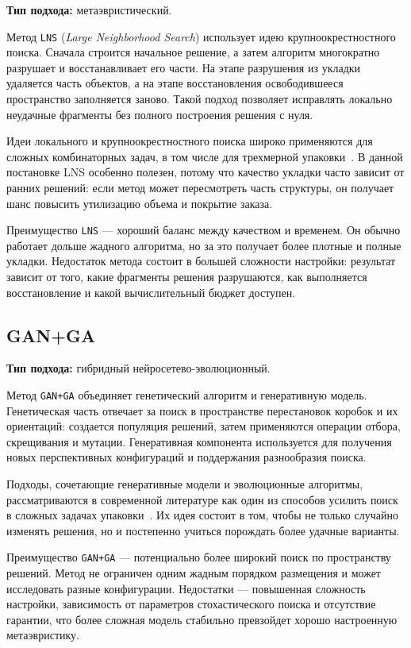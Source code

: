 \documentclass[14pt,a4paper]{extarticle}
\begin{document}
\textbf{Тип подхода:} метаэвристический.

Метод \texttt{LNS} (\textit{Large Neighborhood Search}) использует идею крупноокрестностного поиска. Сначала строится начальное решение, а затем алгоритм многократно разрушает и восстанавливает его части. На этапе разрушения из укладки удаляется часть объектов, а на этапе восстановления освободившееся пространство заполняется заново. Такой подход позволяет исправлять локально неудачные фрагменты без полного построения решения с нуля.

Идеи локального и крупноокрестностного поиска широко применяются для сложных комбинаторных задач, в том числе для трехмерной упаковки~\cite{faroe2003,martello2000}. В данной постановке LNS особенно полезен, потому что качество укладки часто зависит от ранних решений: если метод может пересмотреть часть структуры, он получает шанс повысить утилизацию объема и покрытие заказа.

Преимущество \texttt{LNS} --- хороший баланс между качеством и временем. Он обычно работает дольше жадного алгоритма, но за это получает более плотные и полные укладки. Недостаток метода состоит в большей сложности настройки: результат зависит от того, какие фрагменты решения разрушаются, как выполняется восстановление и какой вычислительный бюджет доступен.

\subsection{GAN+GA}

\textbf{Тип подхода:} гибридный нейросетево-эволюционный.

Метод \texttt{GAN+GA} объединяет генетический алгоритм и генеративную модель. Генетическая часть отвечает за поиск в пространстве перестановок коробок и их ориентаций: создается популяция решений, затем применяются операции отбора, скрещивания и мутации. Генеративная компонента используется для получения новых перспективных конфигураций и поддержания разнообразия поиска.

Подходы, сочетающие генеративные модели и эволюционные алгоритмы, рассматриваются в современной литературе как один из способов усилить поиск в сложных задачах упаковки~\cite{ganga_paper}. Их идея состоит в том, чтобы не только случайно изменять решения, но и постепенно учиться порождать более удачные варианты.

Преимущество \texttt{GAN+GA} --- потенциально более широкий поиск по пространству решений. Метод не ограничен одним жадным порядком размещения и может исследовать разные конфигурации. Недостатки --- повышенная сложность настройки, зависимость от параметров стохастического поиска и отсутствие гарантии, что более сложная модель стабильно превзойдет хорошо настроенную метаэвристику.
\end{document}
